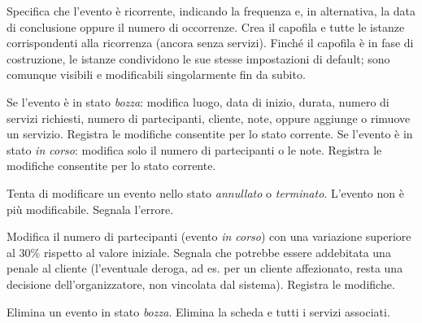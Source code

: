 \newpage
{}

\uctablebegin
    {Specifica che l'evento è ricorrente, indicando la frequenza e,
     in alternativa, la data di conclusione oppure il numero di
     occorrenze.}
    {Crea il capofila e tutte le istanze corrispondenti alla ricorrenza
     (ancora senza servizi). Finché il capofila è in fase di
     costruzione, le istanze condividono le sue stesse
     impostazioni di default; sono comunque visibili e modificabili
     singolarmente fin da subito.}
\uctableend


\uctablebegin
    {Se l'evento è in stato \emph{bozza}: modifica luogo, data di
     inizio, durata, numero di servizi richiesti, numero di partecipanti,
        cliente, note, oppure aggiunge o rimuove un servizio.}
    {Registra le modifiche consentite per lo stato corrente.}
    {Se l'evento è in stato \emph{in corso}: modifica solo il numero di
     partecipanti o le note.}
    {Registra le modifiche consentite per lo stato corrente.}
\uctableend


\uctablebegin
    {Tenta di modificare un evento nello stato \emph{annullato} o
     \emph{terminato}.}
    {L'evento non è più modificabile. Segnala l'errore.}
\uctableend


\uctablebegin
    {Modifica il numero di partecipanti (evento \emph{in corso}) con una
     variazione superiore al 30\% rispetto al valore iniziale.}
    {Segnala che potrebbe essere addebitata una penale al cliente
     (l'eventuale deroga, ad es. per un cliente affezionato, resta una
     decisione dell'organizzatore, non vincolata dal sistema).
     Registra le modifiche.}
\uctableend


\uctablebegin
    {Elimina un evento in stato \emph{bozza}.}
    {Elimina la scheda e tutti i servizi associati.}
\uctableend

